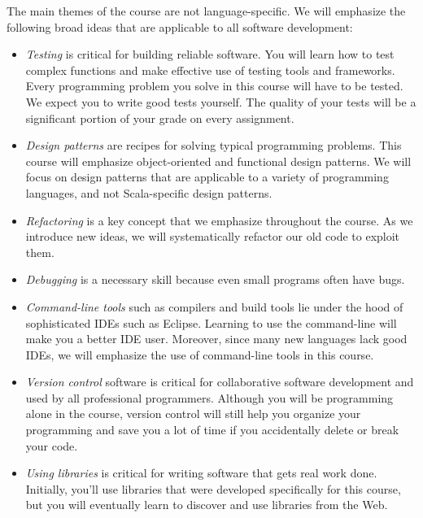 \documentclass{book}
\begin{document}
The main themes of the course are not language-specific. We will emphasize
the following broad ideas that are applicable to all software development:
%
\begin{itemize}

\item \emph{Testing} is critical for building reliable software. You will learn how
  to test complex functions and make effective use of testing tools and frameworks.
  Every programming problem you solve in this course will have to be tested. We
  expect you to write good tests yourself. The quality of your tests will be a
  significant portion of your grade on every assignment.

\item \emph{Design patterns} are recipes for solving typical programming
  problems. This course will emphasize object-oriented and functional
  design patterns. We will focus on design patterns that are applicable to
  a variety of programming languages, and not Scala-specific design patterns.

\item \emph{Refactoring} is a key concept that we emphasize throughout the
  course. As we introduce new ideas, we will systematically refactor our old
  code to exploit them.

\item \emph{Debugging} is a necessary skill because even small programs often
  have bugs.

\item \emph{Command-line tools} such as compilers and build tools lie under the
  hood of sophisticated IDEs such as Eclipse. Learning to use the command-line
  will make you a better IDE user. Moreover, since many new languages lack good
  IDEs, we will emphasize the use of command-line tools in this course.

\item \emph{Version control} software is critical for collaborative software
  development and used by all professional programmers. Although you will be
  programming alone in the course, version control will still help you organize
  your programming and save you a lot of time if you accidentally delete or
  break your code.

\item \emph{Using libraries} is critical for writing software that gets real
  work done. Initially, you'll use libraries that were developed specifically
  for this course, but you will eventually learn to discover and use
  libraries from the Web.

\end{itemize}
\end{document}
